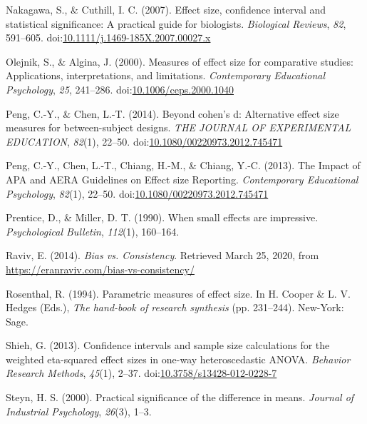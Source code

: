 \documentclass[
  man,floatsintext]{apa6}
\begin{document}
\leavevmode\hypertarget{ref-Nakagawa_and_Cuthill_2007}{}%
Nakagawa, S., \& Cuthill, I. C. (2007). Effect size, confidence interval and statistical significance: A practical guide for biologists. \emph{Biological Reviews}, \emph{82}, 591--605. doi:\href{https://doi.org/10.1111/j.1469-185X.2007.00027.x}{10.1111/j.1469-185X.2007.00027.x}

\leavevmode\hypertarget{ref-Olejnik_Algina_2000}{}%
Olejnik, S., \& Algina, J. (2000). Measures of effect size for comparative studies: Applications, interpretations, and limitations. \emph{Contemporary Educational Psychology}, \emph{25}, 241--286. doi:\href{https://doi.org/10.1006/ceps.2000.1040}{10.1006/ceps.2000.1040}

\leavevmode\hypertarget{ref-Peng_and_Chen_2014}{}%
Peng, C.-Y., \& Chen, L.-T. (2014). Beyond cohen's d: Alternative effect size measures for between-subject designs. \emph{THE JOURNAL OF EXPERIMENTAL EDUCATION}, \emph{82}(1), 22--50. doi:\href{https://doi.org/10.1080/00220973.2012.745471}{10.1080/00220973.2012.745471}

\leavevmode\hypertarget{ref-Peng_et_al_2013}{}%
Peng, C.-Y., Chen, L.-T., Chiang, H.-M., \& Chiang, Y.-C. (2013). The Impact of APA and AERA Guidelines on Effect size Reporting. \emph{Contemporary Educational Psychology}, \emph{82}(1), 22--50. doi:\href{https://doi.org/10.1080/00220973.2012.745471}{10.1080/00220973.2012.745471}

\leavevmode\hypertarget{ref-Prentice_Miller_1992}{}%
Prentice, D., \& Miller, D. T. (1990). When small effects are impressive. \emph{Psychological Bulletin}, \emph{112}(1), 160--164.

\leavevmode\hypertarget{ref-Raviv}{}%
Raviv, E. (2014). \emph{Bias vs. Consistency}. Retrieved March 25, 2020, from \url{https://eranraviv.com/bias-vs-consistency/}

\leavevmode\hypertarget{ref-Rosenthal_1994}{}%
Rosenthal, R. (1994). Parametric measures of effect size. In H. Cooper \& L. V. Hedges (Eds.), \emph{The hand-book of research synthesis} (pp. 231--244). New-York: Sage.

\leavevmode\hypertarget{ref-Shieh_2013}{}%
Shieh, G. (2013). Confidence intervals and sample size calculations for the weighted eta-squared effect sizes in one-way heteroscedastic ANOVA. \emph{Behavior Research Methods}, \emph{45}(1), 2--37. doi:\href{https://doi.org/10.3758/s13428-012-0228-7}{10.3758/s13428-012-0228-7}

\leavevmode\hypertarget{ref-Steyn_2000}{}%
Steyn, H. S. (2000). Practical significance of the difference in means. \emph{Journal of Industrial Psychology}, \emph{26}(3), 1--3.
\end{document}
